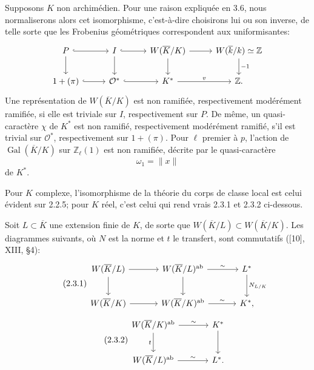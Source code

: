 \documentclass[10pt,letterpaper]{article}
\newcommand{\Z}{\mathbb Z}
\newcommand{\Gal}{\operatorname{Gal}}
\providecommand{\ab}{\mathrm{ab}}
\providecommand{\ab}{\mathrm{ab}}
\providecommand{\ab}{\mathrm{ab}}
\providecommand{\Gal}{\operatorname{Gal}}
\providecommand{\Gal}{\operatorname{Gal}}
\providecommand{\Gal}{\operatorname{Gal}}
\providecommand{\Gal}{\operatorname{Gal}}
\begin{document}
Supposons \(K\) non archimédien. Pour une raison expliquée en 3.6, nous normaliserons alors cet isomorphisme, c'est-à-dire choisirons lui ou son inverse, de telle sorte que les Frobenius géométriques correspondent aux uniformisantes:
\[
\begin{tikzcd}[column sep=2.7em,row sep=1.9em]
P \arrow[r,hook] \arrow[d] & I \arrow[r,hook] \arrow[d] &
W(\overline K/K) \arrow[r] \arrow[d] &
W(\overline k/k)\simeq\Z \arrow[d,"{-1}"]\\
1+(\pi) \arrow[r,hook] & \mathcal O^* \arrow[r,hook] &
K^* \arrow[r,"v"] & \Z .
\end{tikzcd}
\]
Une représentation de \(W(\overline K/K)\) est non ramifiée, respectivement modérément ramifiée, si elle est triviale sur \(I\), respectivement sur \(P\). De même, un quasi-caractère \(\chi\) de \(K^*\) est non ramifié, respectivement modérément ramifié, s'il est trivial sur \(\mathcal O^*\), respectivement sur \(1+(\pi)\). Pour \(\ell\) premier à \(p\), l'action de \(\Gal(\overline K/K)\) sur \(\Z_\ell(1)\) est non ramifiée, décrite par le quasi-caractère
\[
\omega_1=\|x\|
\]
de \(K^*\).

Pour \(K\) complexe, l'isomorphisme de la théorie du corps de classe local est celui évident sur 2.2.5; pour \(K\) réel, c'est celui qui rend vrais 2.3.1 et 2.3.2 ci-dessous.

Soit \(L\subset\overline K\) une extension finie de \(K\), de sorte que \(W(\overline K/L)\subset W(\overline K/K)\). Les diagrammes suivants, où \(N\) est la norme et \(t\) le transfert, sont commutatifs ([10], XIII, §4):
\[
\tag{2.3.1}
\begin{tikzcd}[column sep=3.3em,row sep=2.2em]
W(\overline K/L) \arrow[r] \arrow[d] &
W(\overline K/L)^{\ab} \arrow[r,"\sim"] \arrow[d] &
L^* \arrow[d,"N_{L/K}"]\\
W(\overline K/K) \arrow[r] &
W(\overline K/K)^{\ab} \arrow[r,"\sim"] &
K^* ,
\end{tikzcd}
\]
\[
\tag{2.3.2}
\begin{tikzcd}[column sep=3.5em,row sep=2.3em]
W(\overline K/K)^{\ab} \arrow[r,"\sim"] \arrow[d,"t"'] &
K^* \arrow[d]\\
W(\overline K/L)^{\ab} \arrow[r,"\sim"] &
L^* .
\end{tikzcd}
\]
\end{document}
